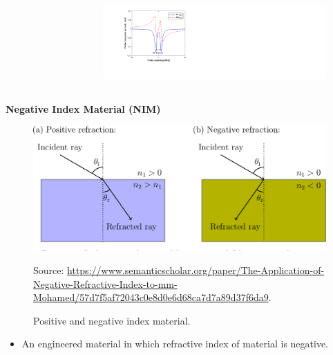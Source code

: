 \documentclass[9pt,aspectratio94]{beamer}
\begin{document}
\begin{frame}
\begin{columns}
\begin{figure}
\begin{tikzpicture}
 \end{tikzpicture}
 \end{figure}
 \begin{figure}
    \includegraphics[scale = 0.3]{Cascade(Analytical).png}
    \end{figure}
    \end{columns}   
\end{frame}

   \begin{frame}{\textbf{Negative Index Material (NIM)}}
   \begin{figure}
       \centering
       \includegraphics[scale=0.2]{NRI (MM).png}
       \caption{Positive and negative index material.}
       \label{fig:enter-label}
       \vspace{2mm}
       \tiny{Source: \url{https://www.semanticscholar.org/paper/The-Application-of-Negative-Refractive-Index-to-mm-Mohamed/57d7f5af72043c0e8d0e6d68ca7d7a89d37f6da9}.}
   \end{figure}
   \begin{itemize}
       \item An engineered material in which refractive index of material is negative.
        \end{itemize}
 \end{frame}
\end{document}
